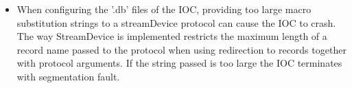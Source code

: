 \documentclass[openany]{article}
\begin{document}
		\begin{itemize}
		\item When configuring the '.db' files of the IOC, providing too large macro substitution strings to a streamDevice protocol can cause the IOC to crash. The way StreamDevice is implemented restricts the maximum length of a record name passed to the protocol when using redirection to records together with protocol arguments. If the string passed is too large the IOC terminates with segmentation fault.
		\end{itemize}
\end{document}
